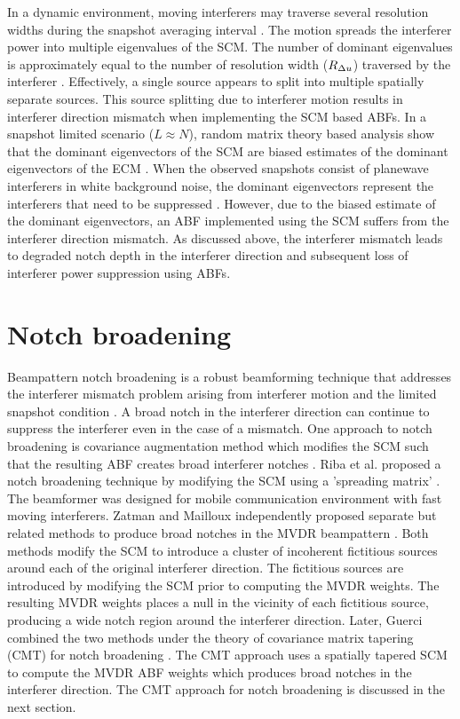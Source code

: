 In a dynamic environment, moving interferers may traverse several
resolution widths during the snapshot averaging interval
\cite{baggeroer1999passive}. The motion spreads the interferer power
into multiple eigenvalues of the SCM. The number of dominant
eigenvalues is approximately equal to the number of resolution width
($R_{\Delta u}$) traversed by the interferer
\cite{cox2000mrabf}. Effectively, a single source appears to split
into multiple spatially separate sources. This source splitting due to
interferer motion results in interferer direction mismatch when
implementing the SCM based ABFs. In a snapshot limited scenario
($L \approx N$), random matrix theory based analysis show that the
dominant eigenvectors of the SCM are biased estimates of the dominant
eigenvectors of the ECM \cite{paul2007asymptotics,
  benaych2011eigen}. When the observed snapshots consist of planewave
interferers in white background noise, the dominant eigenvectors
represent the interferers that need to be suppressed
\cite{vtree2002oap}. However, due to the biased estimate of the
dominant eigenvectors, an ABF implemented using the SCM suffers from
the interferer direction mismatch. As discussed above, the interferer
mismatch leads to degraded notch depth in the interferer direction and
subsequent loss of interferer power suppression using ABFs.

\section{Notch broadening}
\label{sec:notch-broadening}
Beampattern notch broadening is a robust beamforming technique that
addresses the interferer mismatch problem arising from interferer
motion and the limited snapshot condition \cite{vtree2002oap}. A broad
notch in the interferer direction can continue to suppress the
interferer even in the case of a mismatch. One approach to notch
broadening is covariance augmentation method which modifies the SCM
such that the resulting ABF creates broad interferer notches
\cite[Sec.~6.7.6]{vtree2002oap}. Riba et al. proposed a notch
broadening technique by modifying the SCM using a 'spreading matrix'
\cite{riba1997comm}. The beamformer was designed for mobile
communication environment with fast moving interferers. Zatman and
Mailloux independently proposed separate but related methods to
produce broad notches in the MVDR beampattern \cite{zatman1995null,
  mailloux1995null}. Both methods modify the SCM to introduce a
cluster of incoherent fictitious sources around each of the original
interferer direction. The fictitious sources are introduced by
modifying the SCM prior to computing the MVDR weights. The resulting
MVDR weights places a null in the vicinity of each fictitious source,
producing a wide notch region around the interferer direction. Later,
Guerci combined the two methods under the theory of covariance matrix
tapering (CMT) for notch broadening \cite{guerci1999cmt}. The CMT
approach uses a spatially tapered SCM to compute the MVDR ABF weights
which produces broad notches in the interferer direction. The CMT
approach for notch broadening is discussed in the next section.

